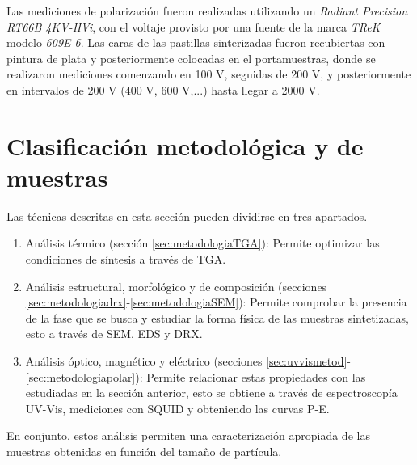 \documentclass[../main.tex]{subfiles}
\begin{document}
Las mediciones de polarización fueron realizadas utilizando un \textit{Radiant Precision RT66B 4KV-HVi}, con el voltaje provisto por una fuente de la marca \textit{TReK} modelo \textit{609E-6}. Las caras de las pastillas sinterizadas fueron recubiertas con pintura de plata y posteriormente colocadas en el portamuestras, donde se realizaron mediciones comenzando en 100 V, seguidas de 200 V, y posteriormente en intervalos de 200 V (400 V, 600 V,...) hasta llegar a 2000 V.

\section{Clasificación metodológica y de muestras}\label{sec:clasifmuestras}
Las técnicas descritas en esta sección pueden dividirse en tres apartados.
\begin{enumerate}
    \item Análisis térmico (sección \ref{sec:metodologiaTGA}): Permite optimizar las condiciones de síntesis a través de TGA.
    \item Análisis estructural, morfológico y de composición (secciones \ref{sec:metodologiadrx}-\ref{sec:metodologiaSEM}): Permite comprobar la presencia de la fase que se busca y estudiar la forma física de las muestras sintetizadas, esto a través de SEM, EDS y DRX.
    \item Análisis óptico, magnético y eléctrico (secciones \ref{sec:uvvismetod}-\ref{sec:metodologiapolar}): Permite relacionar estas propiedades con las estudiadas en la sección anterior, esto se obtiene a través de espectroscopía UV-Vis, mediciones con SQUID y obteniendo las curvas P-E.
\end{enumerate} 
En conjunto, estos análisis permiten una caracterización apropiada de las muestras obtenidas en función del tamaño de partícula.
\end{document}
